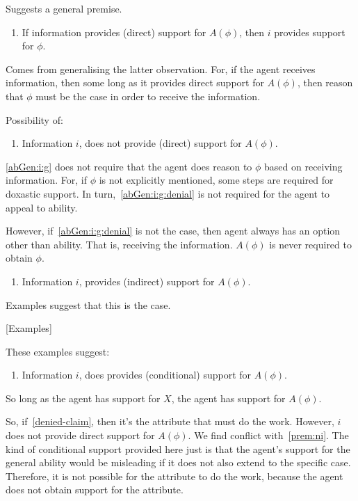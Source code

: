 Suggests a general premise.

\begin{enumerate}
\item\label{abGen:i:g} If information provides (direct) support for \(A(\phi)\), then \(i\) provides support for \(\phi\).
\end{enumerate}

Comes from generalising the latter observation.
For, if the agent receives information, then some long as it provides direct support for \(A(\phi)\), then reason that \(\phi\) must be the case in order to receive the information.

Possibility of:

\begin{enumerate}
\item\label{abGen:i:g:denial} Information \(i\), does not provide (direct) support for \(A(\phi)\).
\end{enumerate}

\ref{abGen:i:g} does not require that the agent does reason to \(\phi\) based on receiving information.
For, if \(\phi\) is not explicitly mentioned, some steps are required for doxastic support.
In turn,~\ref{abGen:i:g:denial} is not required for the agent to appeal to ability.

However, if~\ref{abGen:i:g:denial} is not the case, then agent always has an option other than ability.
That is, receiving the information.
\(A(\phi)\) is never required to obtain \(\phi\).

\begin{enumerate}
\item\label{abGen:i:indirect} Information \(i\), provides (indirect) support for \(A(\phi)\).
\end{enumerate}

Examples suggest that this is the case.

[Examples]

These examples suggest:

\begin{enumerate}
\item\label{abGen:i:conditional} Information \(i\), does provides (conditional) support for \(A(\phi)\).
\end{enumerate}

So long as the agent has support for \(X\), the agent has support for \(A(\phi)\).


So, if~\ref{denied-claim}, then it's the attribute that must do the work.
However, \(i\) does not provide direct support for \(A(\phi)\).
We find conflict with~\ref{prem:ni}.
The kind of conditional support provided here just is that the agent's support for the general ability would be misleading if it does not also extend to the specific case.
Therefore, it is not possible for the attribute to do the work, because the agent does not obtain support for the attribute.

